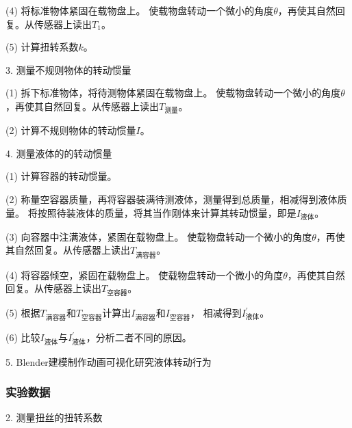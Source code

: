 \documentclass[12pt,hyperref,a4paper,UTF8]{ctexart}
\begin{document}
(4) 将标准物体紧固在载物盘上。
使载物盘转动一个微小的角度$ \theta $，再使其自然回复。从传感器上读出$ T_1 $。

(5) 计算扭转系数$ k $。

3. 测量不规则物体的转动惯量

(1) 拆下标准物体，将待测物体紧固在载物盘上。
使载物盘转动一个微小的角度$ \theta $，再使其自然回复。从传感器上读出$ T_{\text{测量}} $。

(2) 计算不规则物体的转动惯量$ I $。

4. 测量液体的的转动惯量

(1) 计算容器的转动惯量。

(2) 称量空容器质量，再将容器装满待测液体，测量得到总质量，相减得到液体质量。
将按照待装液体的质量，将其当作刚体来计算其转动惯量，即是$ I_{\text{液体}} $。

(3) 向容器中注满液体，紧固在载物盘上。
使载物盘转动一个微小的角度$ \theta $，再使其自然回复。从传感器上读出$ T_{\text{满容器}} $。

(4) 将容器倾空，紧固在载物盘上。
使载物盘转动一个微小的角度$ \theta $，再使其自然回复。从传感器上读出$ T_{\text{空容器}} $。

(5) 根据$ T_{\text{满容器}} $和$ T_{\text{空容器}} $计算出$ I_{\text{满容器}} $和$ I_{\text{空容器}} $，
相减得到$ I_{\text{液体}}^{'} $。

(6) 比较$ I_{\text{液体}} $与$ I_{\text{液体}}^{'} $，分析二者不同的原因。

5. Blender建模制作动画可视化研究液体转动行为

\subsubsection{实验数据}

2. 测量扭丝的扭转系数
\end{document}
